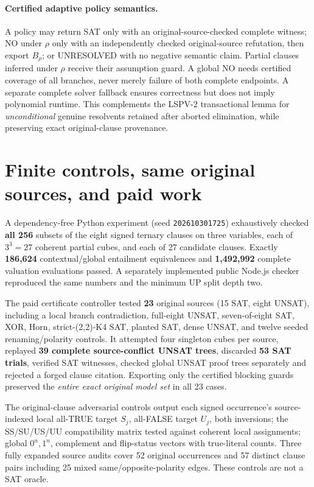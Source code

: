 \documentclass[11pt]{article}
\begin{document}
\paragraph{Certified adaptive policy semantics.}
A policy may return SAT only with an original-source-checked complete witness; NO under \(\rho\) only with an independently checked original-source refutation, then export \(B_\rho\); or UNRESOLVED with no negative semantic claim. Partial clauses inferred under \(\rho\) receive their assumption guard. A global NO needs certified coverage of all branches, never merely failure of both complete endpoints. A separate complete solver fallback ensures correctness but does not imply polynomial runtime. This complements the LSPV-2 transactional lemma for \emph{unconditional} genuine resolvents retained after aborted elimination, while preserving exact original-clause provenance.

\section{Finite controls, same original sources, and paid work}
A dependency-free Python experiment (seed \texttt{202610301725}) exhaustively checked \textbf{all 256} subsets of the eight signed ternary clauses on three variables, each of \(3^3=27\) coherent partial cubes, and each of 27 candidate clauses. Exactly \textbf{186,624} contextual/global entailment equivalences and \textbf{1,492,992} complete valuation evaluations passed. A separately implemented public Node.js checker reproduced the same numbers and the minimum UP split depth two.

The paid certificate controller tested \textbf{23} original sources (15 SAT, eight UNSAT), including a local branch contradiction, full-eight UNSAT, seven-of-eight SAT, XOR, Horn, strict-(2,2)-K4 SAT, planted SAT, dense UNSAT, and twelve seeded renaming/polarity controls. It attempted four singleton cubes per source, replayed \textbf{39 complete source-conflict UNSAT trees}, discarded \textbf{53 SAT trials}, verified SAT witnesses, checked global UNSAT proof trees separately and rejected a forged clause citation. Exporting only the certified blocking guards preserved the \emph{entire exact original model set} in all 23 cases.

The original-clause adversarial controls output each signed occurrence's source-indexed local all-TRUE target \(S_j\), all-FALSE target \(U_j\), both inversions; the SS/SU/US/UU compatibility matrix tested against coherent local assignments; global \(0^n,1^n\), complement and flip-status vectors with true-literal counts. Three fully expanded source audits cover 52 original occurrences and 57 distinct clause pairs including 25 mixed same/opposite-polarity edges. These controls are not a SAT oracle.
\end{document}
